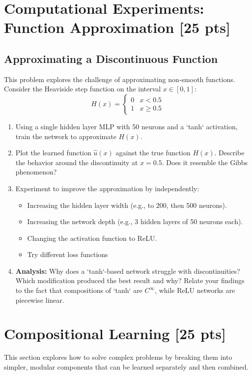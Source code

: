 \documentclass[11pt]{article}
\begin{document}
\section{Computational Experiments: Function Approximation [25 pts]}

\subsection{Approximating a Discontinuous Function}
This problem explores the challenge of approximating non-smooth functions. Consider the Heaviside step function on the interval $x \in [0,1]$:
\[ H(x) = \begin{cases} 0 & x < 0.5 \\ 1 & x \geq 0.5 \end{cases} \]
\begin{enumerate}
    \item[\textbf{a)}] Using a single hidden layer MLP with 50 neurons and a `tanh` activation, train the network to approximate $H(x)$.
    \item[\textbf{b)}] Plot the learned function $\hat{u}(x)$ against the true function $H(x)$. Describe the behavior around the discontinuity at $x=0.5$. Does it resemble the Gibbs phenomenon?
    \item[\textbf{c)}] Experiment to improve the approximation by independently:
        \begin{itemize}
            \item Increasing the hidden layer width (e.g., to 200, then 500 neurons).
            \item Increasing the network depth (e.g., 3 hidden layers of 50 neurons each).
            \item Changing the activation function to ReLU.
            \item Try different loss functions
        \end{itemize}
    \item[\textbf{d)}] \textbf{Analysis:} Why does a `tanh`-based network struggle with discontinuities? Which modification produced the best result and why? Relate your findings to the fact that compositions of `tanh` are $C^\infty$, while ReLU networks are piecewise linear.
\end{enumerate}

\section{Compositional Learning [25 pts]}
This section explores how to solve complex problems by breaking them into simpler, modular components that can be learned separately and then combined.
\end{document}
